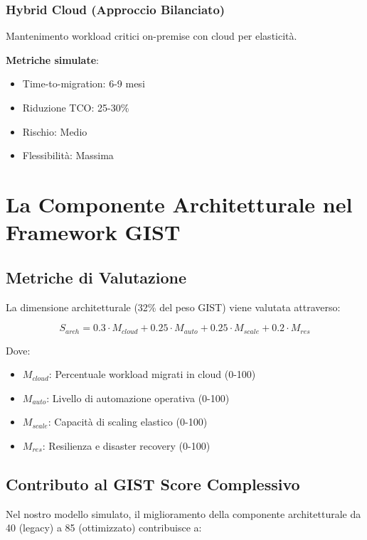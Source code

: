 \subsubsection{Hybrid Cloud (Approccio Bilanciato)}
Mantenimento workload critici on-premise con cloud per elasticità.

\textbf{Metriche simulate}:
\begin{itemize}
\item Time-to-migration: 6-9 mesi
\item Riduzione TCO: 25-30\%
\item Rischio: Medio
\item Flessibilità: Massima
\end{itemize}

\section{La Componente Architetturale nel Framework GIST}

\subsection{Metriche di Valutazione}

La dimensione architetturale (32\% del peso GIST) viene valutata attraverso:

\begin{equation}
S_{arch} = 0.3 \cdot M_{cloud} + 0.25 \cdot M_{auto} + 0.25 \cdot M_{scale} + 0.2 \cdot M_{res}
\end{equation}

Dove:
\begin{itemize}
\item $M_{cloud}$: Percentuale workload migrati in cloud (0-100)
\item $M_{auto}$: Livello di automazione operativa (0-100)
\item $M_{scale}$: Capacità di scaling elastico (0-100)
\item $M_{res}$: Resilienza e disaster recovery (0-100)
\end{itemize}

\subsection{Contributo al GIST Score Complessivo}

Nel nostro modello simulato, il miglioramento della componente architetturale da 40 (legacy) a 85 (ottimizzato) contribuisce a:

